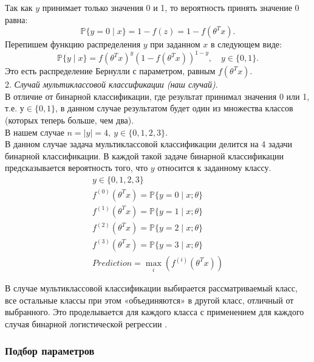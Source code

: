 Так как $y$ принимает только значения 0 и 1, то вероятность принять значение 0 равна:
\begin{equation*}
    {\mathbb {P}}\{y=0\mid x\}=1-f(z)=1-f(\theta ^{T}x).
\end{equation*}
Перепишем функцию распределения $y$ при заданном $x$ в следующем виде:
\begin{equation*}
    {\mathbb {P}}\{y\mid x\}=f(\theta ^{T}x)^{y}(1-f(\theta ^{T}x))^{{1-y}},\quad y\in \{0,1\}.
\end{equation*}
Это есть распределение Бернулли с параметром, равным $f(\theta ^{T}x)$.\\[5mm]
2. \textit{Случай мультиклассовой классификации (наш случай)}.\\[0.5 cm]
В отличие от бинарной классификации, где результат принимал значения 0 или 1,
т.е. $у\in\lbrace 0, 1\rbrace$, в данном случае результатом будет один из множества классов (которых
теперь больше, чем два).\\
В нашем случае $n = |y|=4,\:y\in \lbrace 0, 1, 2, 3\rbrace$.\\
В данном случае задача мультиклассовой классификации делится на 4 задачи бинарной
классификации. В каждой такой задаче бинарной классификации предсказывается вероятность
того, что $y$ относится к заданному классу.
\begin{eqnarray*}
    y\in\lbrace 0, 1, 2, 3\rbrace\\
    f^{(0)}(\theta ^{T}x)={\mathbb {P}}\{y=0\mid x;\theta\}\\
    f^{(1)}(\theta ^{T}x)={\mathbb {P}}\{y=1\mid x;\theta\}\\
    f^{(2)}(\theta ^{T}x)={\mathbb {P}}\{y=2\mid x;\theta\}\\
    f^{(3)}(\theta ^{T}x)={\mathbb {P}}\{y=3\mid x;\theta\}\\
    Prediction = \max\limits_i(f^{(i)}(\theta ^{T}x))
\end{eqnarray*}

В случае мультиклассовой классификации выбирается рассматриваемый класс, все
остальные классы при этом «объединяются» в другой класс, отличный от выбранного.
Это проделывается для каждого класса с применением для каждого случая
бинарной логистической регрессии \cite{ML_lectures}.

\subsubsection{Подбор параметров}

